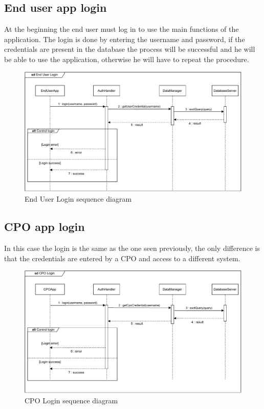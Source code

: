 \subsection{End user app login}
At the beginning the end user must log in to use the main functions of the application. The login is done by entering the username and password, if the credentials are present in the database the process will be successful and he will be able to use the application, otherwise he will have to repeat the procedure.
\begin{figure}[H]
    \centering
    \includegraphics[width=\textwidth]{images/sd_endUserLogin.pdf}
    \caption{End User Login sequence diagram}
    \label{fig:endUserLogin}
\end{figure}
\subsection{CPO app login}
In this case the login is the same as the one seen previously, the only difference is that the credentials are entered by a CPO and access to a different system.
\begin{figure}[H]
    \centering
    \includegraphics[width=\textwidth]{images/sd_cpoLogin.pdf}
    \caption{CPO Login sequence diagram}
    \label{fig:endUserLogin}
\end{figure}
